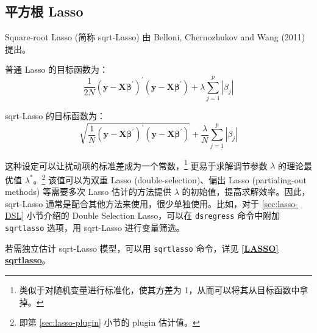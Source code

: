 \subsection{平方根 Lasso}\label{sec:sqrt-lasso}

Square-root Lasso (简称 sqrt-Lasso) 由 Belloni, Chernozhukov and Wang (2011) 提出。

普通 Lasso 的目标函数为：
$$
\frac{1}{2 N}\left(\mathbf{y}-\mathbf{X} \boldsymbol{\beta}^{\prime}\right)^{\prime}\left(\mathbf{y}-\mathbf{X} \boldsymbol{\beta}^{\prime}\right)+\lambda \sum_{j=1}^{p}\left|\beta_{j}\right|
$$

sqrt-Lasso 的目标函数为：
\begin{equation}\label{eq:lasso-sqrt}
	\sqrt{\frac{1}{N}\left(\mathbf{y}-\mathbf{X} \boldsymbol{\beta}^{\prime}\right)^{\prime}\left(\mathbf{y}-\mathbf{X} \boldsymbol{\beta}^{\prime}\right)}+\frac{\lambda}{N} \sum_{j=1}^{p}\left|\beta_{j}\right|
\end{equation}

这种设定可以让扰动项的标准差成为一个常数，\footnote{%
  类似于对随机变量进行标准化，使其方差为 1，从而可以将其从目标函数中拿掉。}
更易于求解调节参数 $\lambda$ 的理论最优值 $\lambda^*$。\footnote{%
      即第 \ref{sec:lasso-plugin} 小节的 plugin 估计值。}
该值可以为双重 Lasso (double-selection)、偏出 Lasso (partialing-out methods) 等需要多次 Lasso 估计的方法提供 $\lambda$ 的初始值，提高求解效率。因此，sqrt-Lasso 通常是配合其他方法来使用，很少单独使用。比如，对于 \ref{sec:lasso-DSL} 小节介绍的 Double Selection Lasso，可以在 \texttt{dsregress} 命令中附加 \texttt{sqrtlasso} 选项，用 sqrt-Lasso 进行变量筛选。

若需独立估计 sqrt-Lasso 模型，可以用 \texttt{sqrtlasso} 命令，详见 \href{https://www.stata.com/manuals/lassosqrtlasso.pdf}{\bfseries{[\MakeUppercase{lasso}] sqrtlasso}}。


%


